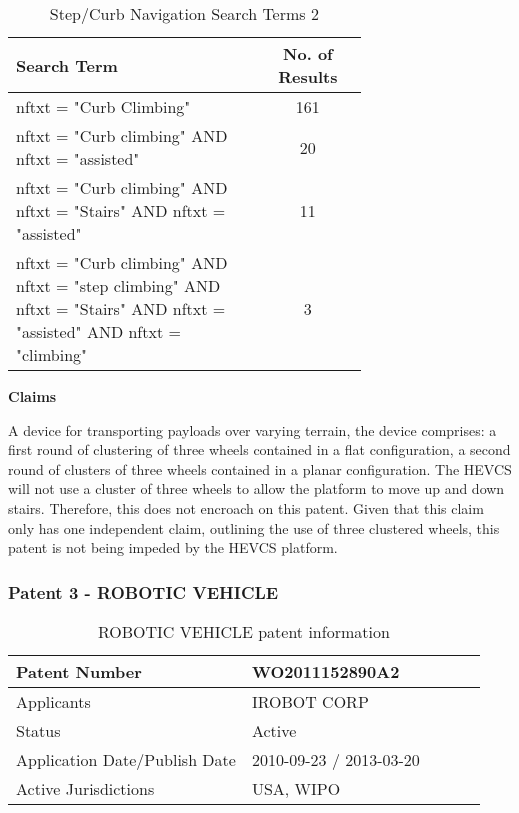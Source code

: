 \documentclass [12pt]{article}
\begin{document}
\begin{table}[H]
    \centering
    \setlength{\arrayrulewidth}{1.5pt}
    \begin{tabular}{|p{0.7\linewidth}|c|}
    \hline
    \cellcolor{gray!40}Search Term & \cellcolor{gray!40}No. of Results \\
    \hline
    nftxt = "Curb Climbing" & 161 \\
    \hline
    nftxt = "Curb climbing" AND nftxt = "assisted" & 20 \\
    \hline
    nftxt = "Curb climbing" AND nftxt = "Stairs" AND nftxt = "assisted" & 11 \\
    \hline
    nftxt = "Curb climbing" AND nftxt = "step climbing" AND nftxt = "Stairs" AND nftxt = "assisted" AND nftxt = "climbing" & 3 \\
    \hline
    \end{tabular}
    \caption{Step/Curb Navigation Search Terms 2}
    \label{table:step_curb_nav_st_2}
\end{table}

\textbf{Claims}

A device for transporting payloads over varying terrain, the device comprises: a first round of clustering of three wheels contained in a flat configuration, a second round of clusters of three wheels contained in a planar configuration.
The HEVCS will not use a cluster of three wheels to allow the platform to move up and down stairs. Therefore, this does not encroach on this patent.
Given that this claim only has one independent claim, outlining the use of three clustered wheels, this patent is not being impeded by the HEVCS platform.

\subsubsection{Patent 3 - ROBOTIC VEHICLE}

\begin{table}[H]
    \centering
    \setlength{\arrayrulewidth}{1.5pt}
    \begin{tabular}{|p{0.5\linewidth}|p{0.5\linewidth}|}
    \hline
    Patent Number & WO2011152890A2\\
    \hline
    Applicants & IROBOT CORP\\
    \hline
    Status & Active\\
    \hline
    Application Date/Publish Date & 2010-09-23 / 2013-03-20\\
    \hline
    Active Jurisdictions & USA, WIPO\\
    \hline
    \end{tabular}
    \caption{ROBOTIC VEHICLE patent information}
    \label{table:robotic_vehicle_patent_information}
\end{table}
\end{document}
